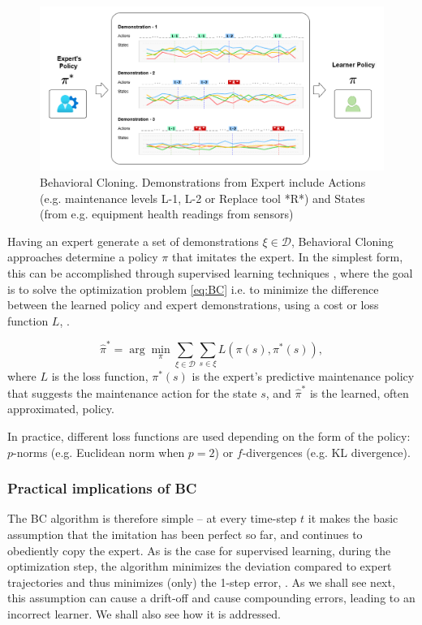 \documentclass{article}
\begin{document}
\begin{figure}[H]
\centering
\includegraphics[width=\linewidth]{images/BC_Diagram.png}
\caption{Behavioral Cloning. Demonstrations from Expert include Actions (e.g. maintenance levels L-1, L-2 or Replace tool *R*) and States (from e.g. equipment health readings from sensors)}
\label{fig:BC}
\end{figure}

Having an expert generate a set of demonstrations $\xi \in \mathcal{D}$, Behavioral Cloning approaches determine a policy $\pi$ that imitates the expert. In the simplest form, this can be accomplished through supervised learning techniques \citep{abbeel2004apprenticeship, yue2018imitation}, where the goal is to solve the optimization problem \eqref{eq:BC} i.e. to minimize the difference between the learned policy and expert demonstrations, using a cost or loss function $L$, \citep{stanford-lectures}.  

\begin{equation}\label{eq:BC}
\hat{\pi}^* = \arg\min_{\pi} \sum_{\xi \in \mathcal{D}} \sum_{s \in \xi} L(\pi(s), \pi^*(s)),
\end{equation}
where $L$ is the loss function, $\pi^*(s)$ is the expert's predictive maintenance policy that suggests the maintenance action for the state $s$, and $\hat{\pi}^*$ is the learned, often approximated, policy.

In practice, different loss functions are used depending on the form of the policy: $p$-norms (e.g. Euclidean norm when $p=2$) or $f$-divergences (e.g. KL divergence).

\subsubsection{Practical implications of BC}
The BC algorithm is therefore simple -- at every time-step $t$ it makes the basic assumption that the imitation has been perfect so far, and continues to obediently copy the expert. As is the case for supervised learning, during the optimization step, the algorithm minimizes the deviation compared to expert trajectories and thus minimizes (only) the 1-step error, \citep{yue2018imitation}. As we shall see next, this assumption can cause a drift-off and cause compounding errors, leading to an incorrect learner. We shall also see how it is addressed. 
\end{document}
